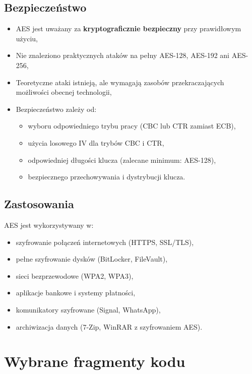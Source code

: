 \documentclass[12pt,a4paper]{article}
\begin{document}
\subsection{Bezpieczeństwo}
\begin{itemize}
    \item AES jest uważany za \textbf{kryptograficznie bezpieczny} przy prawidłowym użyciu,
    \item Nie znaleziono praktycznych ataków na pełny AES-128, AES-192 ani AES-256,
    \item Teoretyczne ataki istnieją, ale wymagają zasobów przekraczających możliwości obecnej technologii,
    \item Bezpieczeństwo zależy od:
    \begin{itemize}
        \item wyboru odpowiedniego trybu pracy (CBC lub CTR zamiast ECB),
        \item użycia losowego IV dla trybów CBC i CTR,
        \item odpowiedniej długości klucza (zalecane minimum: AES-128),
        \item bezpiecznego przechowywania i dystrybucji klucza.
    \end{itemize}
\end{itemize}

\subsection{Zastosowania}
AES jest wykorzystywany w:
\begin{itemize}
    \item szyfrowanie połączeń internetowych (HTTPS, SSL/TLS),
    \item pełne szyfrowanie dysków (BitLocker, FileVault),
    \item sieci bezprzewodowe (WPA2, WPA3),
    \item aplikacje bankowe i systemy płatności,
    \item komunikatory szyfrowane (Signal, WhatsApp),
    \item archiwizacja danych (7-Zip, WinRAR z szyfrowaniem AES).
\end{itemize}

\newpage
\section{Wybrane fragmenty kodu}
\end{document}
